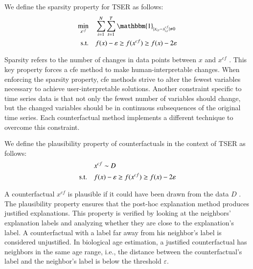 \begin{definition}
We define the sparsity property for TSER as follows:
\begin{equation}
\begin{aligned}
\min_{x^{cf}} \quad & \sum_{i=1}^{N} \sum_{t=1}^{T} \mathbbm{1}_{|x_{i, t}-x_{i, t}^{c f}| \neq 0}\\
\mathrm{s.t.} \quad & \valid{x}{x^{c f}}\\
\end{aligned}
\end{equation}
\label{def:sparsity}
\end{definition}
Sparsity refers to the number of changes in data points between $x$ and $x^{c f}$ \cite{mothilal_explaining_2020}. This key property forces a \gls{cfe} method to make human-interpretable changes.
When enforcing the sparsity property, \gls{cfe} methods strive to alter the fewest variables necessary to achieve user-interpretable solutions.
Another constraint specific to time series data is that not only the fewest number of variables should change, but the changed variables should be in continuous subsequences of the original time series. Each counterfactual method implements a different technique to overcome this constraint.

\begin{definition}
We define the plausibility property of counterfactuals in the context of TSER as follows:
\begin{equation}
\begin{aligned}
 \quad & x^{c f} \sim D\\
\mathrm{s.t.} \quad & f(x) - \varepsilon \geq f(x^{c f}) \geq f(x) - 2\varepsilon\\
\end{aligned}
\end{equation}
\label{def:plausibility}
\end{definition}
A counterfactual $x^{c f}$ is plausible if it could have been drawn from the data $D$ \cite{laugel_dangers_2019}. The plausibility property ensures that the post-hoc explanation method produces justified explanations. This property is verified by looking at the neighbors' explanation labels and analyzing whether they are close to the explanation's label. A counterfactual with a label far away from his neighbor's label is considered unjustified. In biological age estimation, a justified counterfactual has neighbors in the same age range, i.e., the distance between the counterfactual's label and the neighbor's label is below the threshold $\varepsilon$. 


